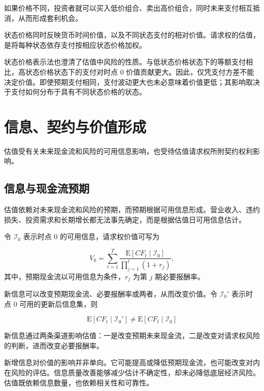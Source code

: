 如果价格不同，投资者就可以买入低价组合、卖出高价组合，同时未来支付相互抵消，从而形成套利机会。

状态价格同时反映货币时间价值，以及不同状态支付的相对价值。请求权的估值，是将每种状态依存支付按相应状态价格加权。

状态价格表示法也澄清了估值中风险的性质。与低状态价格状态下的等额支付相比，高状态价格状态下的支付对时点 0 价值贡献更大。因此，仅凭支付方差不能决定价值。即使预期支付相同，支付波动更大也未必意味着价值更低；其影响取决于支付如何分布于具有不同状态价格的状态。

\section{信息、契约与价值形成}

估值受有关未来现金流和风险的可用信息影响，也受待估值请求权所附契约权利影响。

\subsection{信息与现金流预期}

估值依赖对未来现金流和风险的预期，而预期根据可用信息形成。营业收入、违约损失、投资需求和长期增长都无法事先确定，而是根据估值日可用信息估计。

令 $\mathcal{I}_0$ 表示时点 0 的可用信息，请求权价值可写为

\begin{equation}
V_0=\sum_{t=1}^{T}
\frac{\mathrm{E}[CF_t\mid \mathcal{I}_0]}
{\prod_{j=1}^{t}(1+r_j)},
\label{eq:ch5-information-conditional-value}
\end{equation}
其中，预期现金流以可用信息为条件，$r_j$ 为第 $j$ 期必要报酬率。

新信息可以改变预期现金流、必要报酬率或两者，从而改变价值。令 $\mathcal{I}_0'$ 表示时点 0 可用的更新后信息集，则




\begin{equation*}
\mathrm{E}[CF_t\mid \mathcal{I}_0']
\neq
\mathrm{E}[CF_t\mid \mathcal{I}_0]
\end{equation*}

新信息通过两条渠道影响估值：一是改变预期未来现金流，二是改变对请求权风险的判断，进而改变必要报酬率。

新增信息对价值的影响并非单向。它可能提高或降低预期现金流，也可能改变对内在风险的评估。信息质量改善能够减少估计不确定性，却未必降低底层经济风险。估值既依赖信息数量，也依赖相关性和可靠性。









